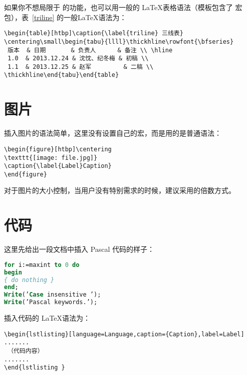如果你不想局限于  的功能，也可以用一般的 \LaTeX 表格语法（模板包含了  宏包），表~\ref{triline} 的一般\LaTeX 语法为：
\begin{lstlisting}[language={[LaTeX]TeX},caption={三线表的一般\LaTeX 语法示例}]
\begin{table}[htbp]\caption{\label{triline} 三线表}
\centering\small\begin{tabu}{llll}\thickhline\rowfont{\bfseries}
 版本  & 日期       & 负责人      & 备注 \\ \hline
 1.0  & 2013.12.24 & 沈忱、纪冬梅 & 初稿 \\
 1.1  & 2013.12.25 & 赵军         & 二稿 \\
\thickhline\end{tabu}\end{table}
\end{lstlisting}

\section{图片}
插入图片的语法简单，这里没有设置自己的宏，而是用的是普通语法：
\begin{lstlisting}[language={[LaTeX]TeX},caption={插入图片语法示例}]
\begin{figure}[htbp]\centering
\texttt{[image: file.jpg]} 
\caption{\label{Label}Caption}
\end{figure}\end{lstlisting}
对于图片的大小控制，当用户没有特别需求的时候，建议采用的倍数方式。

\section{代码}
这里先给出一段文档中插入 Pascal 代码的样子：
\begin{lstlisting}[language=Pascal,caption={Pascal 代码示例},label=PascalExample]
for i:=maxint to 0 do
begin
{ do nothing }
end;
Write(’Case insensitive ’);
Write(’Pascal keywords.’);
\end{lstlisting}

插入代码的 \LaTeX 语法为：
\begin{lstlisting}[language={[LaTeX]TeX},caption={插入代码的语法}]
\begin{lstlisting}[language=Language,caption={Caption},label=Label]
.......
 （代码内容）
.......
\end{lstlisting }\end{lstlisting}

